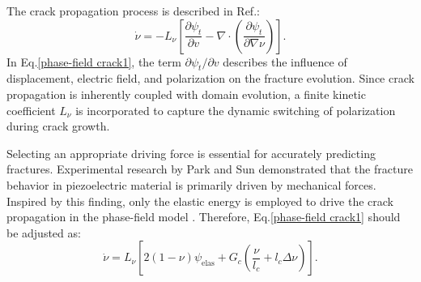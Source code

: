\documentclass[times,fleqn,11pt]{elsarticle}
\begin{document}
The crack propagation process is described in Ref.\cite{abdollahi_phase-field_2011}:
\begin{equation}\label{phase-field crack1}
    \dot{\nu}=-L_\nu \left[ \frac{\partial\psi_t}{\partial v}-\nabla \cdot \left( \frac{\partial \psi_t}{\partial \nabla \nu} \right) \right].
\end{equation}
In Eq.\eqref{phase-field crack1}, the term $\partial\psi_t/\partial v$ describes the influence of displacement, electric field, and polarization on the fracture evolution. Since crack propagation is inherently coupled with domain evolution, a finite kinetic coefficient $L_\nu$ is incorporated to capture the dynamic switching of polarization during crack growth.

Selecting an appropriate driving force is essential for accurately predicting fractures. Experimental research by Park and Sun \cite{park_fracture_1995} demonstrated that the fracture behavior in piezoelectric material is primarily driven by mechanical forces. Inspired by this finding, only the elastic energy is employed to drive the crack propagation in the phase-field model \cite{wu_phase-field_2021}. Therefore, Eq.\eqref{phase-field crack1} should be adjusted as:
\begin{equation}\label{phase-field crack2}
    \dot{\nu}=L_\nu\left[ 2(1-\nu) \psi_\mathrm{elas}+G_c\left(\frac{\nu}{l_c} +l_c\Delta \nu\right) \right].
\end{equation}
\end{document}
